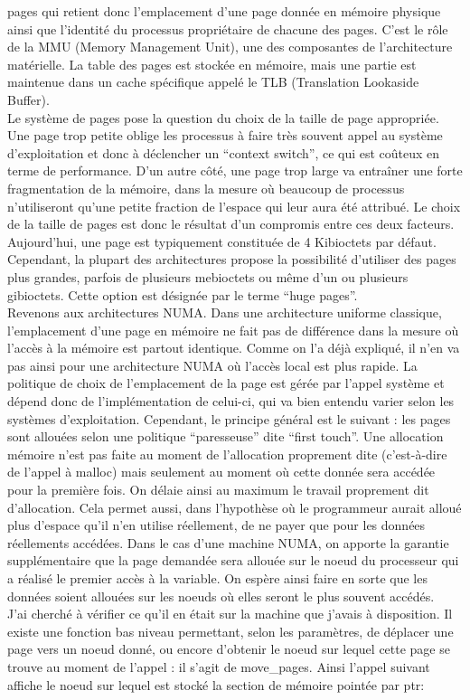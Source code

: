 \documentclass{report}
\begin{document}
pages qui retient donc l'emplacement d'une page donnée en mémoire physique ainsi que l'identité
du processus propriétaire de chacune des pages. C'est le rôle de la MMU (Memory Management Unit),
une des composantes de l'architecture matérielle. La table des pages est stockée en mémoire, mais
une partie est maintenue dans un cache spécifique appelé le TLB (Translation Lookaside Buffer).
\\Le système de pages pose la question du choix de la taille de page appropriée. Une page trop petite
oblige les processus à faire très souvent appel au système d'exploitation et donc à déclencher un
``context switch'', ce qui est coûteux en terme de performance. D'un autre côté, une page trop large
va entraîner une forte fragmentation de la mémoire, dans la mesure où beaucoup de processus 
n'utiliseront qu'une petite fraction de l'espace qui leur aura été attribué. Le choix de la taille
de pages est donc le résultat d'un compromis entre ces deux facteurs. Aujourd'hui, une page est 
typiquement constituée de 4 Kibioctets par défaut. Cependant, la plupart des architectures propose
la possibilité d'utiliser des pages plus grandes, parfois de plusieurs mebioctets ou même d'un ou
plusieurs gibioctets. Cette option est désignée par le terme ``huge pages''\cite{hugePagesDoc}.
\\Revenons aux architectures NUMA. Dans une architecture uniforme classique, l'emplacement d'une
page en mémoire ne fait pas de différence dans la mesure où l'accès à la mémoire est partout identique.
Comme on l'a déjà expliqué, il n'en va pas ainsi pour une architecture NUMA où l'accès local est plus
rapide. La politique de choix de l'emplacement de la page est gérée par l'appel système et dépend
donc de l'implémentation de celui-ci, qui va bien entendu varier selon les systèmes d'exploitation.
Cependant, le principe général est le suivant : les pages sont allouées selon une politique ``paresseuse''
dite ``first touch''. Une allocation mémoire n'est pas faite au moment de l'allocation proprement dite
(c'est-à-dire de l'appel à malloc) mais seulement au moment où cette donnée sera accédée pour la première
fois. On délaie ainsi au maximum le travail proprement dit d'allocation. Cela permet aussi, dans 
l'hypothèse où le programmeur aurait alloué plus d'espace qu'il n'en utilise réellement, de ne payer que
pour les données réellements accédées. Dans le cas d'une machine NUMA, on apporte la garantie supplémentaire
que la page demandée sera allouée sur le noeud du processeur qui a réalisé le premier accès à la variable.
On espère ainsi faire en sorte que les données soient allouées sur les noeuds où elles seront le plus
souvent accédés.\cite{numaaware}
\\J'ai cherché à vérifier ce qu'il en était sur la machine que j'avais à disposition. Il existe une fonction
bas niveau permettant, selon les paramètres, de déplacer une page vers un noeud donné, ou encore d'obtenir 
le noeud sur lequel cette page se trouve au moment de l'appel : il s'agit de move\_pages. Ainsi l'appel
suivant affiche le noeud sur lequel est stocké la section de mémoire pointée par ptr:
\end{document}
